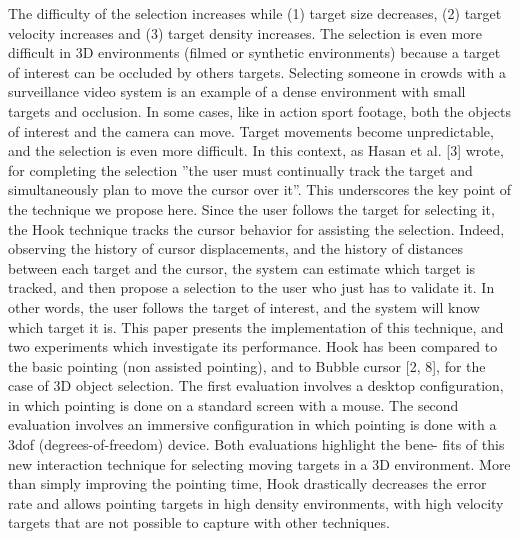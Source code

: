     
 The
difficulty of the selection increases while (1) target size decreases,
(2) target velocity increases and (3) target density increases. The
selection is even more difficult in 3D environments (filmed or synthetic
environments) because a target of interest can be occluded
by others targets. Selecting someone in crowds with a surveillance
video system is an example of a dense environment with small targets
and occlusion. In some cases, like in action sport footage, both
the objects of interest and the camera can move. Target movements
become unpredictable, and the selection is even more difficult.
In this context, as Hasan et al. [3] wrote, for completing the
selection ”the user must continually track the target and simultaneously
plan to move the cursor over it”. This underscores the key
point of the technique we propose here. Since the user follows the
target for selecting it, the Hook technique tracks the cursor behavior
for assisting the selection. Indeed, observing the history of cursor
displacements, and the history of distances between each target and
the cursor, the system can estimate which target is tracked, and then
propose a selection to the user who just has to validate it. In other
words, the user follows the target of interest, and the system will
know which target it is.
This paper presents the implementation of this technique, and
two experiments which investigate its performance. Hook has been
compared to the basic pointing (non assisted pointing), and to Bubble
cursor [2, 8], for the case of 3D object selection. The first evaluation
involves a desktop configuration, in which pointing is done
on a standard screen with a mouse. The second evaluation involves
an immersive configuration in which pointing is done with a 3dof
(degrees-of-freedom) device. Both evaluations highlight the bene-
fits of this new interaction technique for selecting moving targets in
a 3D environment. More than simply improving the pointing time,
Hook drastically decreases the error rate and allows pointing targets
in high density environments, with high velocity targets that are not
possible to capture with other techniques.


	
		

\clearpage
